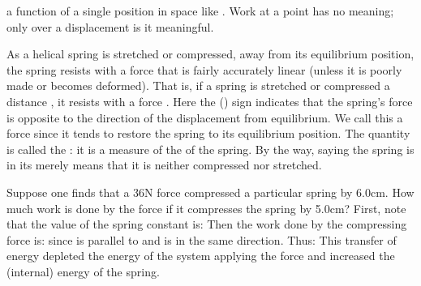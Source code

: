 {


\noindent
a function of a single position in space like .
Work at a point has no meaning; only over a displacement is it meaningful.

As a helical spring is stretched or compressed, away from its equilibrium
position, the spring resists with a force that is fairly
accurately linear (unless it is poorly made or becomes deformed).
That is, if a  spring is stretched or compressed a distance ,
it resists with a force .
Here the (\m{-}) sign indicates that the spring's force is
opposite to the direction of the displacement from equilibrium.
We call this a  force since it tends to restore the spring
to its equilibrium position.
The quantity  is called the : it is a measure of the
 of the spring.
By the way, saying the spring is in its  merely
means that it is neither compressed nor stretched.

Suppose one finds that a 36\unit{N} force compressed a particular spring by
6.0\unit{cm}.
How much work is done by the force if it compresses the spring by 5.0\unit{cm}?
First, note that the value of the spring constant is:
%
%
Then the work done by the compressing force is:
%
%
since  is parallel to  and is in the same direction.
Thus:
%
%
This transfer of energy depleted the energy of the system applying the force
and increased the (internal) energy of the spring.


}
